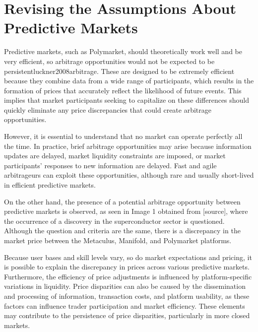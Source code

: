 \section{Revising the Assumptions About Predictive Markets}
\label{sec:revising_assumptions}
Predictive markets, such as Polymarket, should theoretically work well and be very efficient, so arbitrage opportunities would not be expected to be persistent{luckner2008arbitrage}. These are designed to be extremely efficient because they combine data from a wide range of participants, which results in the formation of prices that accurately reflect the likelihood of future events. This implies that market participants seeking to capitalize on these differences should quickly eliminate any price discrepancies that could create arbitrage opportunities.

However, it is essential to understand that no market can operate perfectly all the time. In practice, brief arbitrage opportunities may arise because information updates are delayed, market liquidity constraints are imposed, or market participants' responses to new information are delayed. Fast and agile arbitrageurs can exploit these opportunities, although rare and usually short-lived in efficient predictive markets.

On the other hand, the presence of a potential arbitrage opportunity between predictive markets is observed, as seen in Image 1 obtained from [source], where the occurrence of a discovery in the superconductor sector is questioned. Although the question and criteria are the same, there is a discrepancy in the market price between the Metaculus, Manifold, and Polymarket platforms.

Because user bases and skill levels vary, so do market expectations and pricing, it is possible to explain the discrepancy in prices across various predictive markets. Furthermore, the efficiency of price adjustments is influenced by platform-specific variations in liquidity. Price disparities can also be caused by the dissemination and processing of information, transaction costs, and platform usability, as these factors can influence trader participation and market efficiency. These elements may contribute to the persistence of price disparities, particularly in more closed markets.
